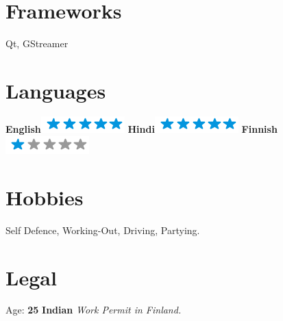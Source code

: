 \documentclass[]{friggeri-cv}
\begin{document}

\newpage

\begin{aside}
~
~
~
   \section{Frameworks}
    Qt, GStreamer
~
  \section{Languages}
    \textbf{English}\includegraphics[scale=0.40]{img/5stars.png}
    \textbf{Hindi}\includegraphics[scale=0.40]{img/5stars.png}
    \textbf{Finnish}\includegraphics[scale=0.40]{img/1stars.png}
~
  \section{Hobbies}
    Self Defence, Working-Out,
    Driving, Partying.
~
\section{Legal}
    Age: \textbf{25}
    \textbf{Indian}
    \emph{Work Permit in Finland.}
~
\end{aside}
\end{document}
